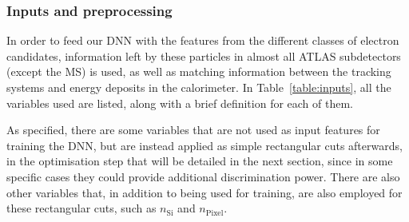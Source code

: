 \subsubsection{Inputs and preprocessing}
In order to feed our DNN with the features from the different classes of electron candidates, information left by these particles in almost all ATLAS subdetectors (except the MS) is used, as well as matching information between the tracking systems and energy deposits in the calorimeter. 
In Table~\ref{table:inputs}, all the variables used are listed, along with a brief definition for each of them.

As specified, there are some variables that are not used as input features for training the DNN, but are instead applied as simple rectangular cuts afterwards, in the optimisation step that will be detailed in the next section, since in some specific cases they could provide additional discrimination power. There are also other variables that, in addition to being used for training, are also employed for these rectangular cuts, such as $n_{\text{Si}}$ and $n_{\text{Pixel}}$.

